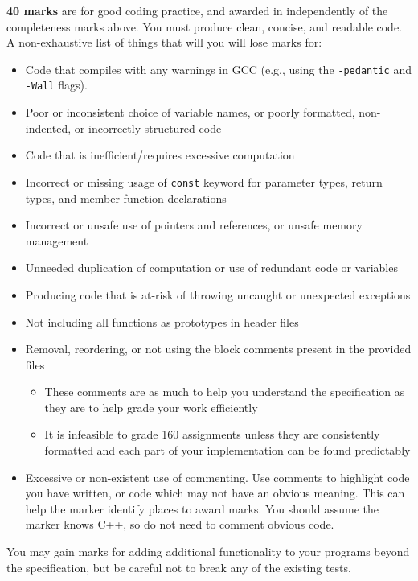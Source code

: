 \documentclass[a4paper]{article}
\begin{document}
\noindent{}\textbf{40 marks} are for good coding practice, and awarded in independently of the completeness marks above. You must produce clean, concise, and readable code. A non-exhaustive list of things that will you will lose marks for:
\begin{itemize}
    \item Code that compiles with any warnings in GCC (e.g., using the \texttt{-pedantic} and \texttt{-Wall} flags).

    \item Poor or inconsistent choice of variable names, or poorly formatted, non-indented, or incorrectly structured code

    \item Code that is inefficient/requires excessive computation

    \item Incorrect or missing usage of \texttt{const} keyword for parameter types, return types, and member function declarations

    \item Incorrect or unsafe use of pointers and references, or unsafe memory management

    \item Unneeded duplication of computation or use of redundant code or variables

    \item Producing code that is at-risk of throwing uncaught or unexpected exceptions

    \item Not including all functions as prototypes in header files

    \item Removal, reordering, or not using the block comments present in the provided files

        \begin{itemize}
            \item These comments are as much to help you understand the specification as they are to help grade your work efficiently
            \item It is infeasible to grade 160 assignments unless they are consistently formatted and each part of your implementation can be found predictably
    \end{itemize}

    \item Excessive or non-existent use of commenting. Use comments to highlight code you have written, or code which may not have an obvious meaning. This can help the marker identify places to award marks. You should assume the marker knows C++, so do not need to comment obvious code.
\end{itemize}

You may gain marks for adding additional functionality to your programs beyond the specification, but be careful not to break any of the existing tests.
\end{document}
